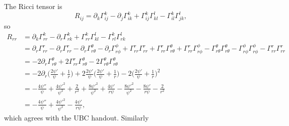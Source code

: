 \documentclass[12pt]{article}
\numberwithin{equation}{section}
\begin{document}
The Ricci tensor is
\begin{equation}
R_{ij} = \partial_k \Gamma^k_{ij} - \partial_j \Gamma^k_{ik} + \Gamma^k_{ij} \Gamma^l_{kl} - \Gamma^k_{il} \Gamma^l_{jk},
\end{equation}
so
\begin{equation}
\begin{aligned}
R_{rr} &= \partial_k \Gamma^k_{rr} - \partial_r \Gamma^k_{rk} + \Gamma^k_{rr} \Gamma^l_{kl} - \Gamma^k_{rl} \Gamma^l_{rk} \\
&= \partial_r \Gamma^r_{rr} - \partial_r \Gamma^r_{r r} - \partial_r \Gamma^\theta_{r\theta} - \partial_r \Gamma^\phi_{r\phi} + \Gamma^r_{rr} \Gamma^r_{rr} + \Gamma^r_{rr} \Gamma^\theta_{r\theta} + \Gamma^r_{rr} \Gamma^\phi_{r \phi} - \Gamma^\theta_{r\theta} \Gamma^\theta_{r\theta} - \Gamma^\phi_{r \phi} \Gamma^\phi_{r\phi} - \Gamma^r_{rr} \Gamma^r_{rr} \\
&= - 2 \partial_r \Gamma^\theta_{r\theta} + 2 \Gamma^r_{rr} \Gamma^\theta_{r\theta} - 2 \Gamma^\theta_{r\theta} \Gamma^\theta_{r\theta} \\
&= - 2 \partial_r \Big( \frac{2 \psi'}{\psi}  + \frac{1}{r} \Big) + 2 \frac{2 \psi'}{\psi} \Big( \frac{2 \psi'}{\psi}  + \frac{1}{r} \Big) - 2 \Big( \frac{2 \psi'}{\psi}  + \frac{1}{r} \Big)^2 \\
&= - \frac{4 \psi''}{\psi} + \frac{4 \psi'^2}{\psi^2} + \frac{2}{r^2} + \frac{8 \psi'^2}{\psi^2}  + \frac{4 \psi'}{r \psi} - \frac{8 \psi'^2}{\psi^2} - \frac{8 \psi'}{r \psi} - \frac{2}{r^2} \\
&= - \frac{4 \psi''}{\psi} + \frac{4 \psi'^2}{\psi^2} - \frac{4 \psi'}{r \psi},
\end{aligned}
\end{equation}
which agrees with the UBC handout.  Similarly
\end{document}
